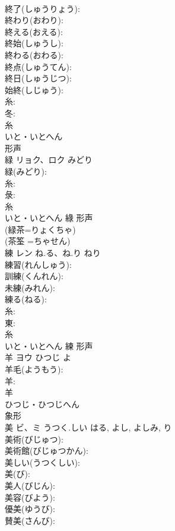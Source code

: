 \documentclass[8pt]{extreport}
\begin{document}
\begin{CJK}{UTF8}{min}
\\	終了(しゅうりょう): 
\\	終わり(おわり): 
\\	終える(おえる): 
\\	終始(しゅうし): 
\\	終わる(おわる): 
\\	終点(しゅうてん): 
\\	終日(しゅうじつ): 
\\	始終(しじゅう): 
\\	糸: 
\\	冬: 
\\	糸	
\\	いと・いとへん	
\\	形声 
\\	緑	リョク、ロク	みどり		
\\	緑(みどり): 
\\	糸: 
\\	彔: 
\\	糸	
\\	いと・いとへん	綠	形声 
\\	(緑茶=りょくちゃ) 
\\	(茶筌 =ちゃせん) 
\\	練	レン	ね.る、ね.り	ねり	
\\	練習(れんしゅう): 
\\	訓練(くんれん): 
\\	未練(みれん): 
\\	練る(ねる): 
\\	糸: 
\\	東: 
\\	糸	
\\	いと・いとへん	練	形声 
\\	羊	ヨウ	ひつじ	よ	
\\	羊毛(ようもう): 
\\	羊: 
\\	羊	
\\	ひつじ・ひつじへん	
\\	象形 
\\	美	ビ、ミ	うつく.しい	はる, よし, よしみ, り	
\\	美術(びじゅつ): 
\\	美術館(びじゅつかん): 
\\	美しい(うつくしい): 
\\	美(び): 
\\	美人(びじん): 
\\	美容(びよう): 
\\	優美(ゆうび): 
\\	賛美(さんび): 

\end{CJK}
\end{document}
